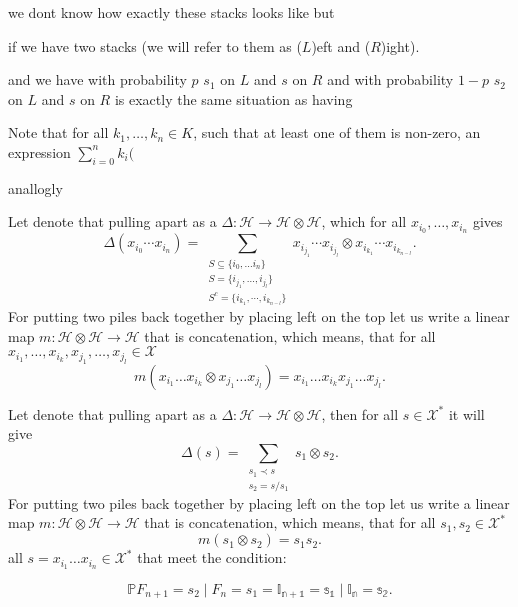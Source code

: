 \documentclass[a4paper]{article}
\begin{document}
 we dont know how exactly these stacks looks
like but

if we have two stacks (we will refer to them as ($L$)eft and ($R$)ight).

and we have with probability $p$ $s_1$ on $L$ and $s$ on $R$ and with probability $1-p$ $s_2$ on $L$ and
$s$ on $R$ is exactly the same situation as having

Note that for all $k_1, \dots, k_n \in K$, such that at least one of them is non-zero,
an expression $\displaystyle \sum^{n}_{i = 0}k_i ($

anallogly

Let denote that pulling apart as a $\Delta : \mathcal{H} \to \mathcal{H} \otimes \mathcal{H}$, which for all
$x_{i_0}, \dots, x_{i_n}$ gives
\begin{equation*}
\Delta(x_{i_0}\cdots x_{i_n}) = \sum_{\substack{S \subseteq
\{ i_0, \dots i_n \} \\ S = \{i_{j_1}, \dots, i_{j_l}\} \\ S^c = \{i_{k_1}, \cdots, i_{k_{n-l}} \}}}
x_{i_{j_1}}\cdots x_{i_{j_l}} \otimes x_{i_{k_1}} \cdots x_{i_{k_{n-l}}}.
\end{equation*}
For putting two piles back together by placing left on the top let us write a linear map
$m : \mathcal{H} \otimes \mathcal{H} \to \mathcal{H}$ that is concatenation, which means, that
for all $x_{i_1}, \dots, x_{i_k}, x_{j_1}, \dots, x_{j_l} \in \mathcal{X}$
\begin{equation*}
m(x_{i_1}\dots x_{i_k} \otimes x_{j_1}\dots x_{j_l}) = x_{i_1}\ldots x_{i_k}x_{j_1}\ldots x_{j_l}.
\end{equation*}

Let denote that pulling apart as a $\Delta : \mathcal{H} \to \mathcal{H} \otimes \mathcal{H}$, then for all
$s \in \mathcal{X}^*$ it will give
\begin{equation*}
\Delta(s) = \sum_{\substack{s_1 \prec s \\ s_2 = s/s_1}}
s_1 \otimes s_2.
\end{equation*}
For putting two piles back together by placing left on the top let us write a linear map
$m : \mathcal{H} \otimes \mathcal{H} \to \mathcal{H}$ that is concatenation, which means, that
for all $s_1, s_2 \in \mathcal{X}^*$
\begin{equation*}
m(s_1 \otimes s_2) = s_1s_2.
\end{equation*}
 all $s = x_{i_1}\dots x_{i_n} \in \mathcal{X}^*$
that meet the condition:

\begin{equation*}
\mathbb{P}{F_{n+1} = s_2 \mid F_n = s_1 } = \mathbb{I_{n+1} = s_1 \mid I_n = s_2}.
\end{equation*}
\end{document}

